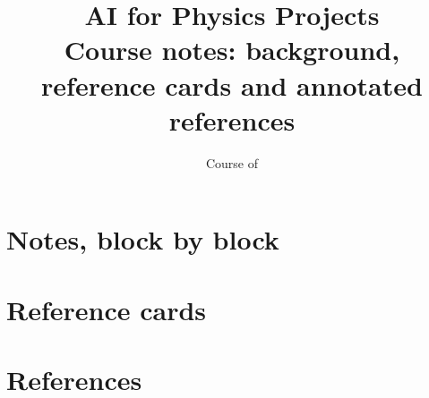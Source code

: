 \documentclass[11pt,a4paper]{article}
\title{\textbf{AI for Physics Projects}\\[4pt]
\large Course notes: background, reference cards and annotated references}
\author{}
\date{Course of \coursedate}
\begin{document}
\maketitle
\vspace{-1.5em}



\tableofcontents
\clearpage

\part{Notes, block by block}











\part{Reference cards}



\clearpage
\part{References}

\end{document}
